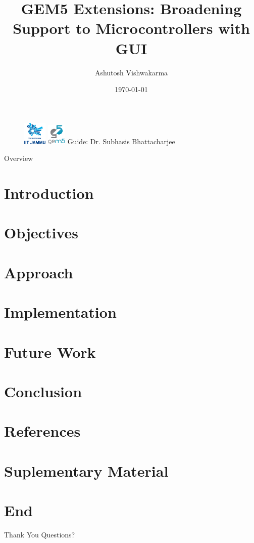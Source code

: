 \documentclass[10pt, aspectratio=169]{beamer}
\title[GEM5 Extensions]{\textbf{GEM5 Extensions}: Broadening Support to Microcontrollers with GUI}
\author{Ashutosh Vishwakarma}
\institute{IIT Jammu}
\date{\today}
\begin{document}
\begin{frame}
  \begin{figure}
    \centering
    \includegraphics[width=0.10\textwidth]{images/iitjammu.png}
    \hspace{1.5cm}
    \includegraphics[width=0.08\textwidth]{images/gem5.png}
    \titlepage
    \centering
    Guide: Dr. Subhasis Bhattacharjee
  \end{figure}
\end{frame}


\begin{frame}{Overview}
  \tableofcontents
\end{frame}

\section{Introduction}


\section{Objectives}


\section{Approach}


\section{Implementation}


\section{Future Work}


\section{Conclusion}
  

\section{References}


\section{Suplementary Material}


\section{End}
\begin{frame}{Thank You}
  \centering
  Questions?
\end{frame}
\end{document}
